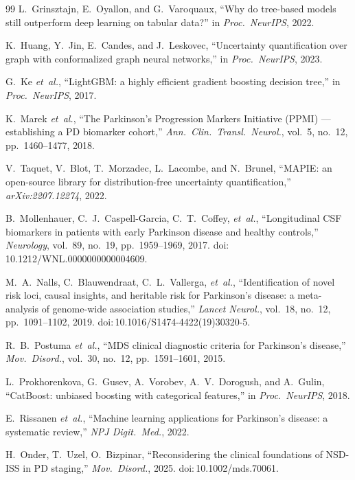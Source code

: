 \documentclass[10pt,letterpaper]{article}
\begin{document}
\begin{thebibliography}{99}
L.~Grinsztajn, E.~Oyallon, and G.~Varoquaux, ``Why do tree-based models still outperform deep learning on tabular data?'' in \textit{Proc.\ NeurIPS}, 2022.

K.~Huang, Y.~Jin, E.~Candes, and J.~Leskovec, ``Uncertainty quantification over graph with conformalized graph neural networks,'' in \textit{Proc.\ NeurIPS}, 2023.

G.~Ke \textit{et~al.}, ``LightGBM: a highly efficient gradient boosting decision tree,'' in \textit{Proc.\ NeurIPS}, 2017.

K.~Marek \textit{et~al.}, ``The Parkinson's Progression Markers Initiative (PPMI) --- establishing a PD biomarker cohort,'' \textit{Ann.\ Clin.\ Transl.\ Neurol.}, vol.~5, no.~12, pp.~1460--1477, 2018.

V.~Taquet, V.~Blot, T.~Morzadec, L.~Lacombe, and N.~Brunel, ``MAPIE: an open-source library for distribution-free uncertainty quantification,'' \textit{arXiv:2207.12274}, 2022.

B.~Mollenhauer, C.~J.~Caspell-Garcia, C.~T.~Coffey, \textit{et~al.}, ``Longitudinal CSF biomarkers in patients with early Parkinson disease and healthy controls,'' \textit{Neurology}, vol.~89, no.~19, pp.~1959--1969, 2017. doi:\,10.1212/WNL.0000000000004609.

M.~A.~Nalls, C.~Blauwendraat, C.~L.~Vallerga, \textit{et~al.}, ``Identification of novel risk loci, causal insights, and heritable risk for Parkinson's disease: a meta-analysis of genome-wide association studies,'' \textit{Lancet Neurol.}, vol.~18, no.~12, pp.~1091--1102, 2019. doi:\,10.1016/S1474-4422(19)30320-5.

R.~B.~Postuma \textit{et~al.}, ``MDS clinical diagnostic criteria for Parkinson's disease,'' \textit{Mov.\ Disord.}, vol.~30, no.~12, pp.~1591--1601, 2015.

L.~Prokhorenkova, G.~Gusev, A.~Vorobev, A.~V.~Dorogush, and A.~Gulin, ``CatBoost: unbiased boosting with categorical features,'' in \textit{Proc.\ NeurIPS}, 2018.

E.~Rissanen \textit{et~al.}, ``Machine learning applications for Parkinson's disease: a systematic review,'' \textit{NPJ Digit.\ Med.}, 2022.

H.~Onder, T.~Uzel, O.~Bizpinar, ``Reconsidering the clinical foundations of NSD-ISS in PD staging,'' \textit{Mov.\ Disord.}, 2025. doi:\,10.1002/mds.70061.


\end{thebibliography}
\end{document}
